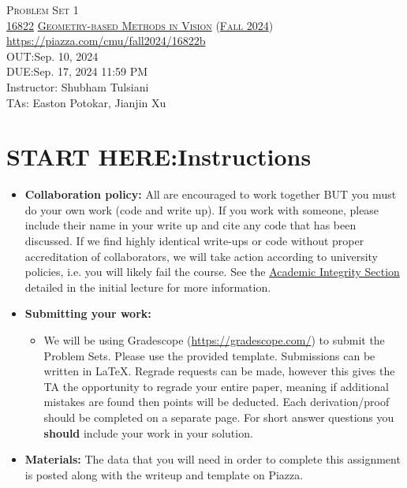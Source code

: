 \documentclass[11pt]{exam}
\title{\textsc{\hwName}} %
\author{}
\date{}
\date{}
\numberwithin{equation}{section} %
\numberwithin{figure}{section} %
\numberwithin{table}{section} %
\newcommand{\courseNum}{\href{https://geometric3d.github.io}{16822}}
\newcommand{\courseName}{\href{https://geometric3d.github.io}{Geometry-based Methods in Vision}}
\newcommand{\courseSem}{\href{https://geometric3d.github.io}{Fall 2024}}
\newcommand{\courseUrl}{\url{https://piazza.com/cmu/fall2024/16822b}}
\newcommand{\hwNum}{Problem Set 1}
\newcommand{\outDate}{Sep. 10, 2024}
\newcommand{\dueDate}{Sep. 17, 2024 11:59 PM}
\newcommand{\instructorName}{Shubham Tulsiani}
\newcommand{\taNames}{Easton Potokar, Jianjin Xu}
\begin{document}
\section*{}
\begin{center}
    \textsc{\LARGE \hwNum} \\
    \vspace{1em}
    \textsc{\large \courseNum{} \courseName{} (\courseSem)} \\
    \courseUrl\\
    \vspace{1em}
    OUT:\@ \outDate\\
    DUE:\@ \dueDate\\
    Instructor: \instructorName\\
    TAs: \taNames\\
\end{center}

\section*{START HERE:\@ Instructions}
\begin{itemize}
    \item \textbf{Collaboration policy:} All are encouraged to work together BUT you must do your own work (code and write up). If you work with someone, please include their name in your write up and cite any code that has been discussed. If we find highly identical write-ups or code without proper accreditation of collaborators, we will take action according to university policies, i.e. you will likely fail the course. See the \href{https://www.dropbox.com/s/z6o0tinc9eaez46/L01_Overview.pdf?dl=0}{Academic Integrity Section} detailed in the initial lecture for more information.

    \item\textbf{Submitting your work:}

          \begin{itemize}

              \item We will be using Gradescope (\url{https://gradescope.com/}) to submit the
                    Problem Sets. Please use the provided template. Submissions can be written in
                    LaTeX. Regrade requests can be made, however this gives the TA the opportunity
                    to regrade your entire paper, meaning if additional mistakes are found then
                    points will be deducted. Each derivation/proof should be completed on a
                    separate page. For short answer questions you \textbf{should} include your work
                    in your solution.
          \end{itemize}

    \item \textbf{Materials:} The data that you will need in order to complete this assignment is posted along with the writeup and template on Piazza.

\end{itemize}
\end{document}
